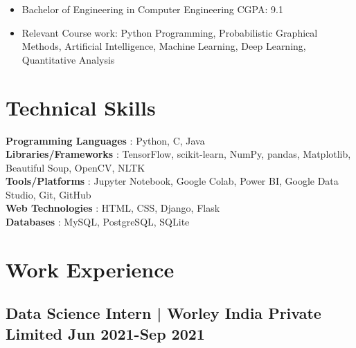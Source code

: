 \documentclass[10pt]{article}
\newenvironment{zitemize}{
\begin{itemize}\itemsep2pt \parskip0pt \parsep1pt}
{\end{itemize}\vspace{-0.7cm}}
\newcommand{\hskills}[1]{
\textbf{\bfseries #1} }
\begin{document}
    \begin{zitemize}
        
        \item Bachelor of Engineering in Computer Engineering \hfill CGPA: 9.1
        \item Relevant Course work: Python Programming, Probabilistic Graphical Methods, Artificial Intelligence, Machine Learning, Deep Learning, Quantitative Analysis
    \end{zitemize}
\section{\textbf{Technical Skills}}
\hskills{Programming Languages }:  Python, C, Java \\
\hskills{Libraries/Frameworks}: TensorFlow, scikit-learn, NumPy, pandas, Matplotlib, Beautiful Soup, OpenCV, NLTK \\
\hskills{Tools/Platforms}: Jupyter Notebook, Google Colab, Power BI, Google Data Studio, Git, GitHub \\
\hskills{Web Technologies}: HTML, CSS, Django, Flask \\
\hskills{Databases}: MySQL, PostgreSQL, SQLite \\

\vspace{-0.5cm}

\section{\textbf{Work Experience}}
    \vspace{2pt}
\subsection*{Data Science Intern | \normalfont{} \normalsize Worley India Private Limited \hfill \textbf{Jun 2021-Sep 2021}} 
\end{document}
